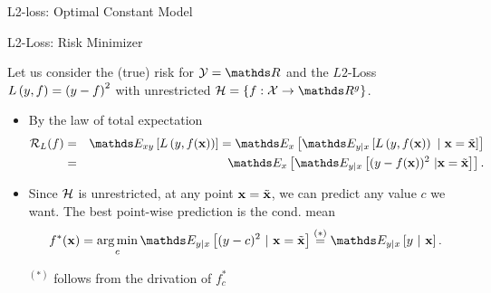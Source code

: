 \documentclass[11pt,compress,t,notes=noshow, xcolor=table]{beamer}
\begin{document}
\begin{vbframe}{L2-loss: Optimal Constant Model}









\end{vbframe}

\begin{vbframe}{L2-Loss: Risk Minimizer}

Let us consider the (true) risk for  $\Yspace = \R$ and the $L2$-Loss $L\left(y, f\right) = \left(y-f\right)^2$ with unrestricted $\Hspace = \{f: \Xspace \to \R^g\}$. 

\begin{itemize}
\item By the law of total expectation
  \begin{eqnarray*}
    \risk_L(f) &=& \E_{xy} \left[\Lxy\right] 
    = \E_x \left[\E_{y|x}\left[\Lxy~|~\xv = \xtil\right]\right] \\
  &=& \E_x
  \left[\E_{y|x}\left[(y-\fx)^2~|\xv = \xtil\right]\right]. 
  \end{eqnarray*}

\item Since $\mathcal{H}$ is unrestricted, at any point $\mathbf{x} = \tilde{\mathbf{x}}$, we can predict any value $c$ we want. The best point-wise prediction is the cond. mean
$$
  \fxbayes = \argmin_c \E_{y|x}\left[(y - c)^2 ~|~ \xv = \xtil \right]\overset{(*)}{=} \E_{y|x} \left[y ~|~ \xv \right]. 
$$

\begin{footnotesize}
$^{(*)}$ follows from the drivation of $f_{c}^{\ast}$
\end{footnotesize}

\end{itemize}


\end{vbframe}
\end{document}
